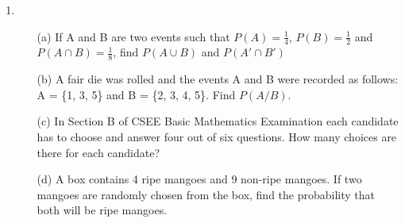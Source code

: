 \begin{enumerate}
	\item
	\begin{enumerate}[topsep=0ex,itemsep=0ex,partopsep=1ex,parsep=1ex]
		\item[(a)] If A and B are two events such that $P(A) = \frac{1}{4}$, $P(B) = \frac{1}{2}$ and $P(A \cap B) = \frac{1}{8}$, find $P(A \cup B)$ and $P(A' \cap B')$
		
		\item[(b)] A fair die was rolled and the events A and B were recorded as follows: A = \{1, 3, 5\} and B = \{2, 3, 4, 5\}. Find $P(A/B)$. 
		
		\item[(c)] In Section B of CSEE Basic Mathematics Examination each candidate has to choose and answer four out of six questions. How many choices are there for each candidate?
		
		\item[(d)] A box contains 4 ripe mangoes and 9 non-ripe mangoes. If two mangoes are randomly chosen from the box, find the probability that both will be ripe mangoes. 
	\end{enumerate}

\end{enumerate}










